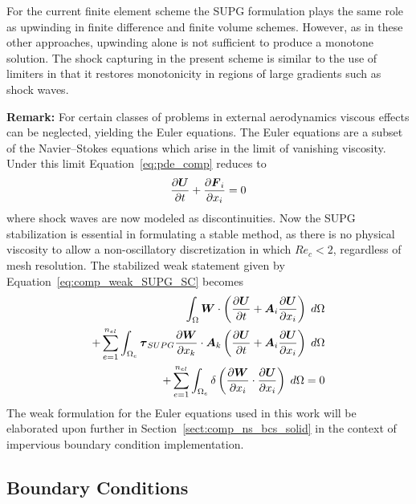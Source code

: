 For the current finite element scheme the SUPG formulation plays the same role as upwinding in finite difference and finite volume schemes.  However, as in these other approaches, upwinding alone is not sufficient to produce a monotone solution.  The shock capturing in the present scheme is similar to the use of limiters in that it restores monotonicity in regions of large gradients such as shock waves.


\textbf{Remark:} For certain classes of problems in external aerodynamics viscous effects can be neglected, yielding the Euler equations. The Euler equations are a subset of the Navier--Stokes equations which arise in the limit of vanishing viscosity.  Under this limit Equation~\eqref{eq:pde_comp} reduces to
\begin{equation}
  \label{eq:pde_comp_euler}
  {\frac{\partial{{\boldsymbol{U}}}}{\partial{t}}} + {\frac{\partial{{\boldsymbol{F}}_i}}{\partial{x_i}}} = 0
\end{equation}
where shock waves are now modeled as discontinuities.  Now the SUPG stabilization is essential in formulating a stable method, as there is no physical viscosity to allow  a non-oscillatory discretization in which $Re_c <2$, regardless of mesh resolution.  The stabilized weak statement given by Equation~\eqref{eq:comp_weak_SUPG_SC} becomes
\begin{eqnarray}
  \label{eq:comp_weak_SUPG_SC_Euler}
  \int_\Omega  {\boldsymbol{W}}\cdot\left({\frac{\partial{{\boldsymbol{U}}}}{\partial{t}}} + {\boldsymbol{A}}_i {\frac{\partial{{\boldsymbol{U}}}}{\partial{x_i}}} \right) \; d\Omega \nonumber \\
  + \sum_{e=1}^{n_{el}} \int_{\Omega_e} {\boldsymbol{\tau}}_{SUPG} {\frac{\partial{{\boldsymbol{W}}}}{\partial{x_k}}}\cdot{\boldsymbol{A}}_k
  \left( {\frac{\partial{{\boldsymbol{U}}}}{\partial{t}}} + {\boldsymbol{A}}_i {\frac{\partial{{\boldsymbol{U}}}}{\partial{x_i}}} \right) \; d\Omega  \nonumber \\
  + \sum_{e=1}^{n_{el}} \int_{\Omega_e} \delta \left({\frac{\partial{{\boldsymbol{W}}}}{\partial{x_i}}}\cdot{\frac{\partial{{\boldsymbol{U}}}}{\partial{x_i}}}\right)\; d\Omega
   = 0
\end{eqnarray}
The weak formulation for the Euler equations used in this work will be elaborated upon further in Section~\ref{sect:comp_ns_bcs_solid} in the context of impervious boundary condition implementation.

\subsection{Boundary Conditions\label{sect:comp_ns_bcs}}


